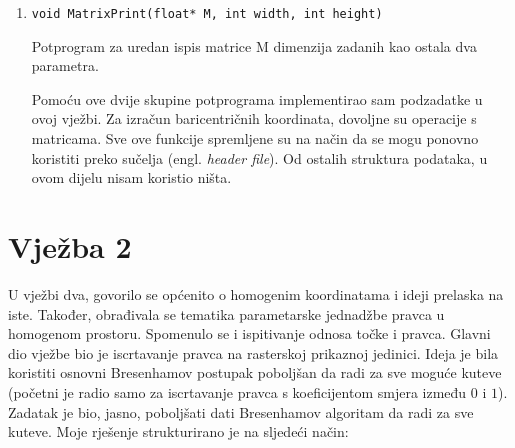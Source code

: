 \documentclass[utf8]{fer}
\begin{document}
\begin{enumerate}
\item \begin{lstlisting}
void MatrixPrint(float* M, int width, int height)
\end{lstlisting}

Potprogram za uredan ispis matrice M dimenzija zadanih kao ostala dva parametra.

Pomoću ove dvije skupine potprograma implementirao sam podzadatke u ovoj vježbi. Za izračun baricentričnih koordinata, dovoljne su operacije s matricama. Sve ove funkcije spremljene su na način da se mogu ponovno koristiti preko sučelja (engl. \textit{header file}). Od ostalih struktura podataka, u ovom dijelu nisam koristio ništa.

\end{enumerate}

\section{Vježba 2}

U vježbi dva, govorilo se općenito o homogenim koordinatama i ideji prelaska na iste. Također, obrađivala se tematika parametarske jednadžbe pravca u homogenom prostoru. Spomenulo se i ispitivanje odnosa točke i pravca. Glavni dio vježbe bio je iscrtavanje pravca na rasterskoj prikaznoj jedinici. Ideja je bila koristiti osnovni Bresenhamov postupak poboljšan da radi za sve moguće kuteve (početni je radio samo za iscrtavanje pravca s koeficijentom smjera između $0$ i $1$). Zadatak je bio, jasno, poboljšati dati Bresenhamov algoritam da radi za sve kuteve. Moje rješenje strukturirano je na sljedeći način:
\end{document}
